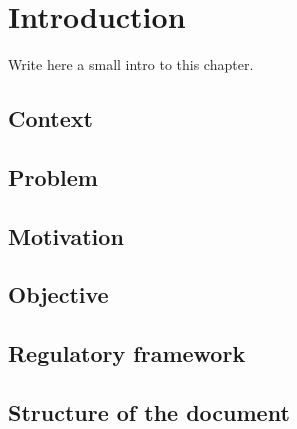 \chapter{Introduction}
\label{chap:01intro}

Write here a small intro to this chapter.

\section{Context}

\section{Problem}

\section{Motivation}

\section{Objective}

\section{Regulatory framework}

\section{Structure of the document}
